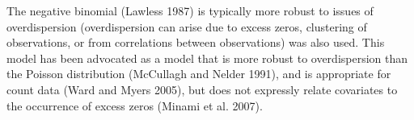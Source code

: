 The negative binomial (Lawless 1987) is typically more robust to issues of overdispersion (overdispersion can arise due to excess zeros, clustering of observations, or from correlations between observations) was also used. This model has been advocated as a model that is more robust to overdispersion than the Poisson distribution (McCullagh and Nelder 1991), and is appropriate for count data (Ward and Myers  2005), but does not expressly relate covariates to the occurrence of excess zeros (Minami et al. 2007).
                                                                                       
